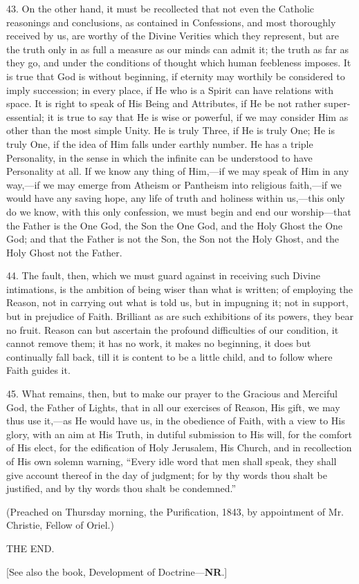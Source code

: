 43. On the other hand, it must be recollected that not even the
Catholic reasonings and conclusions, as contained in Confessions, and
most thoroughly received by us, are worthy of the Divine Verities
which they represent, but are the truth only in as full a measure as
our minds can admit it; the truth as far as they go, and under the
conditions of thought which human feebleness imposes. It is true that
God is without beginning, if eternity may worthily be considered to
imply succession; in every place, if He who is a Spirit can have
relations with space. It is right to speak of His Being and
Attributes, if He be not rather super-essential; it is true to say
that He is wise or powerful, if we may consider Him as other than the
most simple Unity. He is truly Three, if He is truly One; He is truly
One, if the idea of Him falls under earthly number. He has a triple
Personality, in the sense in which the infinite can be understood to
have Personality at all. If we know any thing of Him,—if we may
speak of Him in any way,—if we may emerge from Atheism or Pantheism
into religious faith,—if we would have any saving hope, any life of
truth and holiness within us,—this only do we know, with this only
confession, we must begin and end our worship—that the Father is the
One God, the Son the One God, and the Holy Ghost the One God; and that
the Father is not the Son, the Son not the Holy Ghost, and the Holy
Ghost not the Father.

44. The fault, then, which we must guard against in receiving such
Divine intimations, is the ambition of being wiser than what is
written; of employing the Reason, not in carrying out what is told us,
but in impugning it; not in support, but in prejudice of Faith.
Brilliant as are such exhibitions of its powers, they bear no fruit.
Reason can but ascertain the profound difficulties of our condition,
it cannot remove them; it has no work, it makes no beginning, it does
but continually fall back, till it is content to be a little child,
and to follow where Faith guides it.

45. What remains, then, but to make our prayer to the Gracious and
Merciful God, the Father of Lights, that in all our exercises of
Reason, His gift, we may thus use it,—as He would have us, in the
obedience of Faith, with a view to His glory, with an aim at His
Truth, in dutiful submission to His will, for the comfort of His
elect, for the edification of Holy Jerusalem, His Church, and in
recollection of His own solemn warning, ``Every idle word that men
shall speak, they shall give account thereof in the day of judgment;
for by thy words thou shalt be justified, and by thy words thou shalt
be condemned.''

(Preached on Thursday morning, the Purification, 1843, by
appointment of Mr. Christie, Fellow of Oriel.)

THE END.

[See also the book, Development
of Doctrine—\textbf{NR}.]
